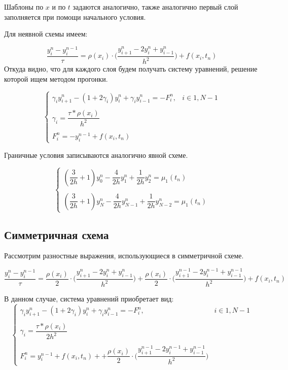 \documentclass[12pt]{article}
\begin{document}
Шаблоны по $x$ и по $t$ задаются аналогично, также аналогично первый слой заполняется при помощи начального условия.

Для неявной схемы имеем:

$$
\dfrac{y_i^n - y_i^{n-1}}{\tau} = \rho(x_i) \cdot \bigg(\dfrac{y_{i+1}^n - 2y_i^n + y_{i-1}^n}{h^2} \bigg) + f(x_i, t_n)
$$
Откуда видно, что для каждого слоя будем получать систему уравнений, решение которой ищем методом прогонки.

$$
\begin{cases}
\gamma_i y_{i+1}^n -(1 + 2\gamma_i) y_i^n + \gamma_i y_{i-1}^n = -F_i^n, & i \in {1, N-1} \\ \\
\gamma_i = \dfrac{\tau * \rho(x_i)}{h^2} \\ \\
F_i^n = -y_i^{n-1} + f(x_i, t_n)
\end{cases}
$$

Граничные условия записываются аналогично явной схеме.

$$
\begin{cases}
(\dfrac{3}{2h} + 1)y_0^n - \dfrac{4}{2h}y_1^n + \dfrac{1}{2h}y_2^n = \mu_1(t_n) \\ \\
(\dfrac{3}{2h} + 1)y_N^n - \dfrac{4}{2h}y_{N-1}^n + \dfrac{1}{2h}y_{N-2}^n = \mu_1(t_n)
\end{cases} 
$$

\newpage
\subsection{Симметричная схема}

Рассмотрим разностные выражения, использующиеся в симметричной схеме.

$$
\dfrac{y_i^n - y_i^{n-1}}{\tau} = \dfrac{\rho(x_i)}{2} \cdot \bigg(\dfrac{y_{i+1}^n - 2y_i^n + y_{i-1}^n}{h^2} \bigg) + \dfrac{\rho(x_i)}{2} \cdot \bigg(\dfrac{y_{i+1}^{n-1}- 2y_i^{n-1} + y_{i-1}^{n-1}}{h^2} \bigg) + f(x_i, t_n)
$$

В данном случае, система уравнений приобретает вид:
$$
\begin{cases}
\gamma_i y_{i+1}^n -(1 + 2\gamma_i) y_i^n + \gamma_i y_{i-1}^n = -F_i^n, & i \in {1, N-1} \\ \\
\gamma_i = \dfrac{\tau * \rho(x_i)}{2h^2} \\ \\
F_i^n = y_i^{n-1} + f(x_i, t_n) + + \dfrac{\rho(x_i)}{2} \cdot \bigg(\dfrac{y_{i+1}^{n-1}- 2y_i^{n-1} + y_{i-1}^{n-1}}{h^2} \bigg)
\end{cases}
$$
\end{document}

